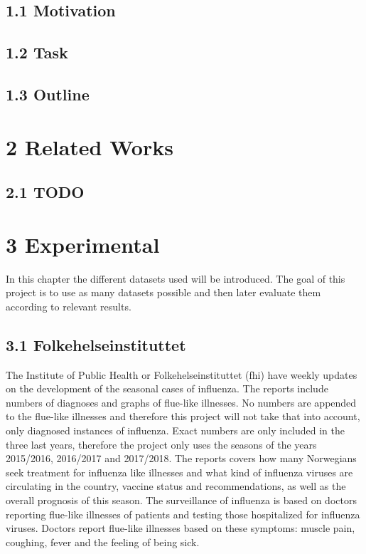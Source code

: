 \documentclass[11pt]{report}
\begin{document}
\section*{1.1 Motivation}

\section*{1.2 Task}

\section*{1.3 Outline}

\chapter*{\vspace{-3cm}2 Related Works}

\section*{2.1 TODO}

\chapter*{\vspace{-3cm}3 Experimental}
In this chapter the different datasets used will be introduced. The goal of this project is to use as many datasets possible and then later evaluate them according to relevant results.

\section*{3.1 Folkehelseinstituttet}
The Institute of Public Health or Folkehelseinstituttet (fhi) have weekly updates\cite{fhi.no} on the development of the seasonal cases of influenza. The reports include numbers of diagnoses and graphs of flue-like illnesses. No numbers are appended to the flue-like illnesses and therefore this project will not take that into account, only diagnosed instances of influenza. Exact numbers are only included in the three last years, therefore the project only uses the seasons of the years 2015/2016, 2016/2017 and 2017/2018. The reports covers how many Norwegians seek treatment for influenza like illnesses and what kind of influenza viruses are circulating in the country, vaccine status and recommendations, as well as the overall prognosis of this season. The surveillance of influenza is based on doctors reporting flue-like illnesses of patients and testing those hospitalized for influenza viruses. Doctors report flue-like illnesses based on these symptoms: muscle pain, coughing, fever and the feeling of being sick.
\end{document}
